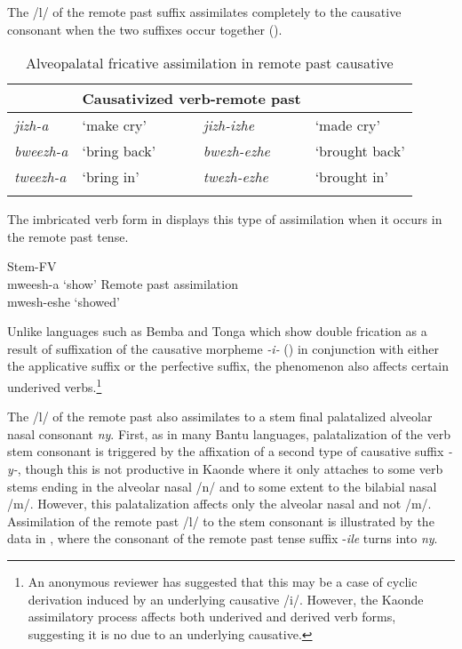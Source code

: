 \documentclass[output=paper]{langsci/langscibook}
\begin{document}
The /l/ of the remote past suffix assimilates completely to the causative consonant when the two suffixes occur together ().


\begin{table}
\begin{tabularx}{\textwidth}{p{2cm}Xp{3cm}X}
\lsptoprule
\multicolumn{2}{l}{Causative verb-\textsc{fv}}  & \multicolumn{2}{l}{Causativized   verb-remote past } \\
\midrule
\textit{jizh-a} & `make cry' & \textit{jizh-izhe} & `made cry' \\
\textit{bweezh-a} & `bring back' & \textit{bwezh-ezhe} & `brought back' \\
\textit{tweezh-a} & `bring in' & \textit{twezh-ezhe} & `brought in' \\

\lspbottomrule
\end{tabularx}

\caption{Alveopalatal fricative assimilation in remote past causative}
\label{tab:7.kawasha}

 \end{table}


The imbricated verb form in  displays this type of assimilation when it occurs in the remote past tense. 


\ea\label{ex:4.kawasha}
   \ea\label{ex:4a.kawasha} {Stem-FV}\\
mweesh-a ‘show’
    \ex\label{ex:4b.kawasha} {Remote past assimilation}\\
mwesh-eshe ‘showed'
\z
\z 


Unlike languages such as Bemba and Tonga which show double frication as a result of suffixation of the causative morpheme \textit{-i-} (\citealt{hyman1995,hyman2003}) in conjunction with either the applicative suffix or the perfective suffix, the phenomenon also affects certain underived verbs.\footnote{An anonymous reviewer has suggested that this may be a case of cyclic derivation induced by an underlying causative /i/. However, the Kaonde assimilatory process affects both underived and derived verb forms, suggesting it is no due to an underlying causative.}

 
The /l/ of the remote past also assimilates to a stem final palatalized alveolar nasal consonant \textit{ny}. First, as in many Bantu languages, palatalization of the verb stem consonant is triggered by the affixation of a second type of causative suffix \textit{-y-}, though this is not productive in Kaonde where it only attaches to some verb stems ending in the alveolar nasal /n/ and to some extent to the bilabial nasal /m/. However, this palatalization affects only the alveolar nasal and not /m/. Assimilation of the remote past /l/ to the stem consonant is illustrated by the data in , where the consonant of the remote past tense suffix -\textit{ile} turns into \textit{ny}.  
 
\end{document}
